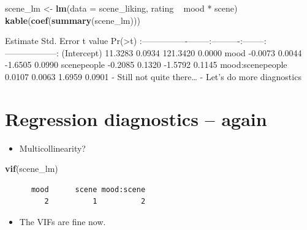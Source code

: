 \documentclass[]{article}
\newenvironment{Shaded}{}{}
\newcommand{\KeywordTok}[1]{\textcolor[rgb]{0.00,0.44,0.13}{\textbf{{#1}}}}
\newcommand{\DataTypeTok}[1]{\textcolor[rgb]{0.56,0.13,0.00}{{#1}}}
\newcommand{\StringTok}[1]{\textcolor[rgb]{0.25,0.44,0.63}{{#1}}}
\newcommand{\NormalTok}[1]{{#1}}
\begin{document}
\begin{Shaded}
\begin{Highlighting}[]
\NormalTok{scene_lm <-}\StringTok{ }\KeywordTok{lm}\NormalTok{(}\DataTypeTok{data =} \NormalTok{scene_liking, rating ~}\StringTok{ }\NormalTok{mood *}\StringTok{ }\NormalTok{scene)}
\KeywordTok{kable}\NormalTok{(}\KeywordTok{coef}\NormalTok{(}\KeywordTok{summary}\NormalTok{(scene_lm)))}
\end{Highlighting}
\end{Shaded}

\textbar{} \textbar{} Estimate\textbar{} Std. Error\textbar{} t
value\textbar{} Pr(\textgreater{}\textbar{}t\textbar{})\textbar{}
\textbar{}:----------------\textbar{}--------:\textbar{}----------:\textbar{}--------:\textbar{}------------------:\textbar{}
\textbar{}(Intercept) \textbar{} 11.3283\textbar{} 0.0934\textbar{}
121.3420\textbar{} 0.0000\textbar{} \textbar{}mood \textbar{}
-0.0073\textbar{} 0.0044\textbar{} -1.6505\textbar{} 0.0990\textbar{}
\textbar{}scenepeople \textbar{} -0.2085\textbar{} 0.1320\textbar{}
-1.5792\textbar{} 0.1145\textbar{} \textbar{}mood:scenepeople \textbar{}
0.0107\textbar{} 0.0063\textbar{} 1.6959\textbar{} 0.0901\textbar{} -
Still not quite there\ldots{} - Let's do more diagnostics

\section{Regression diagnostics --
again}\label{regression-diagnostics-again}

\begin{itemize}
\itemsep1pt\parskip0pt
\item
  Multicollinearity?
\end{itemize}

\begin{Shaded}
\begin{Highlighting}[]
\KeywordTok{vif}\NormalTok{(scene_lm)}
\end{Highlighting}
\end{Shaded}

\begin{verbatim}
      mood      scene mood:scene 
         2          1          2 
\end{verbatim}

\begin{itemize}
\itemsep1pt\parskip0pt
\item
  The VIFs are fine now.
\end{itemize}
\end{document}
